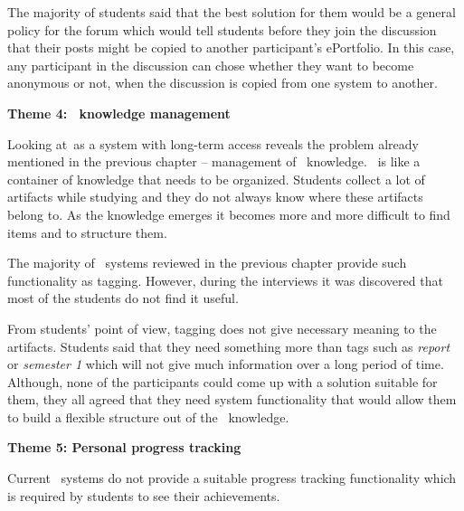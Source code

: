 The majority of students said that the best solution for them would be a general policy for the forum
which would tell students before they join the discussion that their posts might
be copied to another participant’s ePortfolio. In this case, any participant in the discussion can chose whether they want to become anonymous or
not, when the discussion is copied from one system to another.


\textbf{Theme 4: \ep~knowledge management}

Looking at\ep~as a system with long-term access reveals the problem already
mentioned in the previous chapter -- management of \ep~knowledge. \ep~is like a
container of knowledge that needs to be organized. Students collect a lot of
artifacts while studying and they do not always know where these artifacts
belong to. As the knowledge emerges it becomes more and more difficult to find
items and to structure them.


The majority of \ep~systems reviewed in the previous chapter provide such
functionality as tagging. However, during the interviews it was discovered that
most of the students do not find it useful.


From students' point of view, tagging does not give necessary meaning to the
artifacts. Students said that they need something more than tags such as
\textit{report} or \textit{semester 1} which will not give much information over
a long period of time. Although, none of the participants could come up with a
solution suitable for them, they all agreed that they need system functionality
that would allow them to build a flexible structure out of the \ep~knowledge.

\textbf{Theme 5: Personal progress tracking}

Current \ep~systems do not provide a suitable progress tracking
functionality which is required by students to see their achievements.


